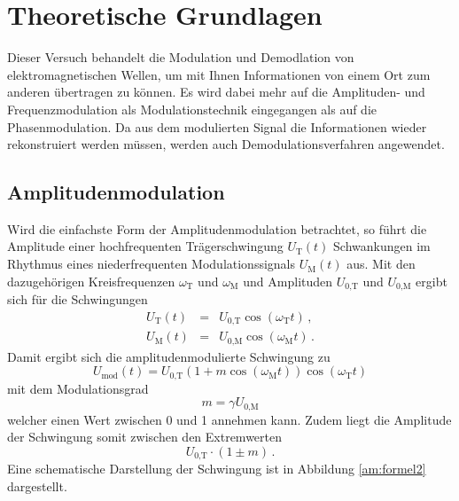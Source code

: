 \section{Theoretische Grundlagen}
\label{sec:theorie}

Dieser Versuch behandelt die Modulation und Demodlation von elektromagnetischen Wellen, um mit Ihnen Informationen von einem Ort
zum anderen übertragen zu können.
Es wird dabei mehr auf die Amplituden- und Frequenzmodulation als Modulationstechnik eingegangen als auf die Phasenmodulation.
Da aus dem modulierten Signal die Informationen wieder rekonstruiert werden müssen, werden auch Demodulationsverfahren angewendet.

\subsection{Amplitudenmodulation}
\label{subsec:klassisch}

Wird die einfachste Form der Amplitudenmodulation betrachtet, so führt die Amplitude einer hochfrequenten Trägerschwingung $U_\text{T}(t)$ Schwankungen im Rhythmus eines niederfrequenten Modulationssignals $U_\text{M}(t)$ aus.
Mit den dazugehörigen Kreisfrequenzen $\omega_\text{T}$ und $\omega_\text{M}$ und Amplituden $U_\text{0,T}$ und $U_\text{0,M}$ ergibt sich für die Schwingungen
\begin{eqnarray*}
    U_\text{T}(t) &=& U_\text{0,T} \cos{\left(\omega_\text{T} t\right)}\, , \\
    U_\text{M}(t) &=& U_\text{0,M} \cos{\left(\omega_\text{M} t \right)}\, .
\end{eqnarray*}
Damit ergibt sich die amplitudenmodulierte Schwingung zu
\begin{equation}
    U_\text{mod}(t) = U_\text{0,T} ( 1 + m \cos{\left( \omega_\text{M} t \right)} ) \cos{\left(\omega_\text{T} t\right)} \label{am:formel1}
\end{equation}
mit dem Modulationsgrad
\begin{equation}
    m = \gamma U_\text{0,M}
\end{equation}
welcher einen Wert zwischen 0 und 1 annehmen kann.
Zudem liegt die Amplitude der Schwingung somit zwischen den Extremwerten
\begin{equation}
    U_\text{0,T} \cdot (1 \pm m)\,.
\end{equation}
Eine schematische Darstellung der Schwingung ist in Abbildung \ref{am:formel2} dargestellt.

